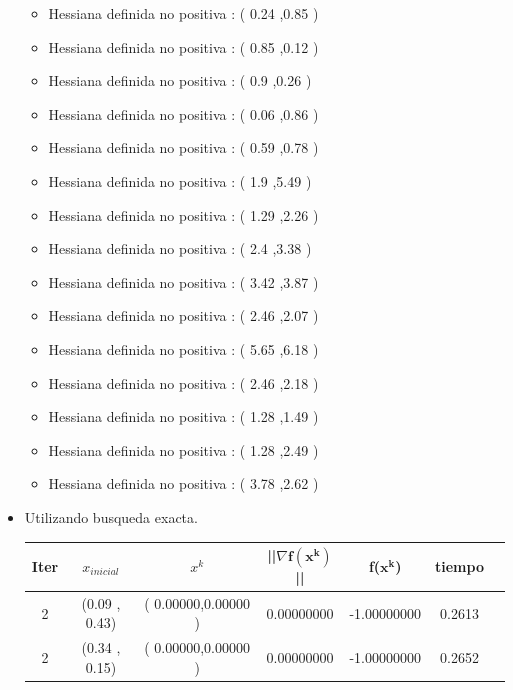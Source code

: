 \begin{itemize}
\begin{itemize}
\item  Hessiana definida no positiva : ( 0.24 ,0.85 )
\item  Hessiana definida no positiva : ( 0.85 ,0.12 )
\item  Hessiana definida no positiva : ( 0.9 ,0.26 )
\item  Hessiana definida no positiva : ( 0.06 ,0.86 )
\item  Hessiana definida no positiva : ( 0.59 ,0.78 )
\item  Hessiana definida no positiva : ( 1.9 ,5.49 )
\item  Hessiana definida no positiva : ( 1.29 ,2.26 )
\item  Hessiana definida no positiva : ( 2.4 ,3.38 )
\item  Hessiana definida no positiva : ( 3.42 ,3.87 )
\item  Hessiana definida no positiva : ( 2.46 ,2.07 )
\item  Hessiana definida no positiva : ( 5.65 ,6.18 )
\item  Hessiana definida no positiva : ( 2.46 ,2.18 )
\item  Hessiana definida no positiva : ( 1.28 ,1.49 )
\item  Hessiana definida no positiva : ( 1.28 ,2.49 )
\item  Hessiana definida no positiva : ( 3.78 ,2.62 )
\end{itemize}









\item Utilizando busqueda exacta.

\begin{table}[H]
\centering
\renewcommand{\arraystretch}{1.2} %
\begin{tabular}{|c|c|c|c|c|c|c|}
\hline
\textbf{Iter} & \textbf{$x_{inicial}$} &\textbf{$x^k$} & \textbf{||$\nabla \mathbf{f(x^k)}$}|| & \textbf{f($\mathbf{x^k}$)} & \textbf{tiempo} \\
\hline
2  &  (0.09 , 0.43) &( 0.00000,0.00000 ) & 0.00000000 & -1.00000000 & 0.2613 \\
2  &  (0.34 , 0.15) &( 0.00000,0.00000 ) & 0.00000000 & -1.00000000 & 0.2652 \\
\hline
\end{tabular}
\end{table}



\end{itemize}
